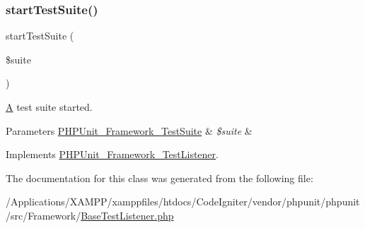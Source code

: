 \subsubsection{\texorpdfstring{start\+Test\+Suite()}{startTestSuite()}}
{\footnotesize\ttfamily start\+Test\+Suite (\begin{DoxyParamCaption}\item[{\mbox{\hyperlink{class_p_h_p_unit___framework___test_suite}{P\+H\+P\+Unit\+\_\+\+Framework\+\_\+\+Test\+Suite}}}]{\$suite }\end{DoxyParamCaption})}

\mbox{\hyperlink{class_a}{A}} test suite started.


\begin{DoxyParams}[1]{Parameters}
\mbox{\hyperlink{class_p_h_p_unit___framework___test_suite}{P\+H\+P\+Unit\+\_\+\+Framework\+\_\+\+Test\+Suite}} & {\em \$suite} & \\
\hline
\end{DoxyParams}


Implements \mbox{\hyperlink{interface_p_h_p_unit___framework___test_listener_a901a86a623d83184267b21f2daee0ff5}{P\+H\+P\+Unit\+\_\+\+Framework\+\_\+\+Test\+Listener}}.



The documentation for this class was generated from the following file\+:\begin{DoxyCompactItemize}
\item 
/\+Applications/\+X\+A\+M\+P\+P/xamppfiles/htdocs/\+Code\+Igniter/vendor/phpunit/phpunit/src/\+Framework/\mbox{\hyperlink{_framework_2_base_test_listener_8php}{Base\+Test\+Listener.\+php}}\end{DoxyCompactItemize}
